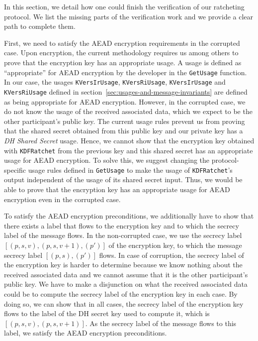 In this section, we detail how one could finish the verification of our ratcheting protocol.
We list the missing parts of the verification work and we provide a clear path to complete them.

First, we need to satisfy the AEAD encryption requirements in the corrupted case.
Upon encryption, the current methodology requires us among others to prove that the encryption key has an appropriate usage.
A usage is defined as “appropriate” for AEAD encryption by the developer in the \texttt{GetUsage} function.
In our case, the usages \texttt{KVersIrUsage}, \texttt{KVersRiUsage}, \texttt{KVersIrUsage} and \texttt{KVersRiUsage} defined in section~\ref{sec:usages-and-message-invariants} are defined as being appropriate for AEAD encryption.
However, in the corrupted case, we do not know the usage of the received associated data, which we expect to be the other participant's public key.
The current usage rules prevent us from proving that the shared secret obtained from this public key and our private key has a \emph{DH Shared Secret} usage.
Hence, we cannot show that the encryption key obtained with \texttt{KDFRatchet} from the previous key and this shared secret has an appropriate usage for AEAD encryption.
To solve this, we suggest changing the protocol-specific usage rules defined in \texttt{GetUsage} to make the usage of \texttt{KDFRatchet}'s output independent of the usage of its shared secret input.
Thus, we would be able to prove that the encryption key has an appropriate usage for AEAD encryption even in the corrupted case.

To satisfy the AEAD encryption preconditions, we additionally have to show that there exists a label that flows to the encryption key and to which the secrecy label of the message flows.
In the non-corrupted case, we use the secrecy label $[(p,s,v),(p,s,v+1),(p')]$ of the encryption key, to which the message secrecy label $[(p,s),(p')]$ flows.
In case of corruption, the secrecy label of the encryption key is harder to determine because we know nothing about the received associated data and we cannot assume that it is the other participant's public key.
We have to make a disjunction on what the received associated data could be to compute the secrecy label of the encryption key in each case.
By doing so, we can show that in all cases, the secrecy label of the encryption key flows to the label of the DH secret key used to compute it, which is $[(p,s,v),(p,s,v+1)]$. As the secrecy label of the message flows to this label, we satisfy the AEAD encryption preconditions.

